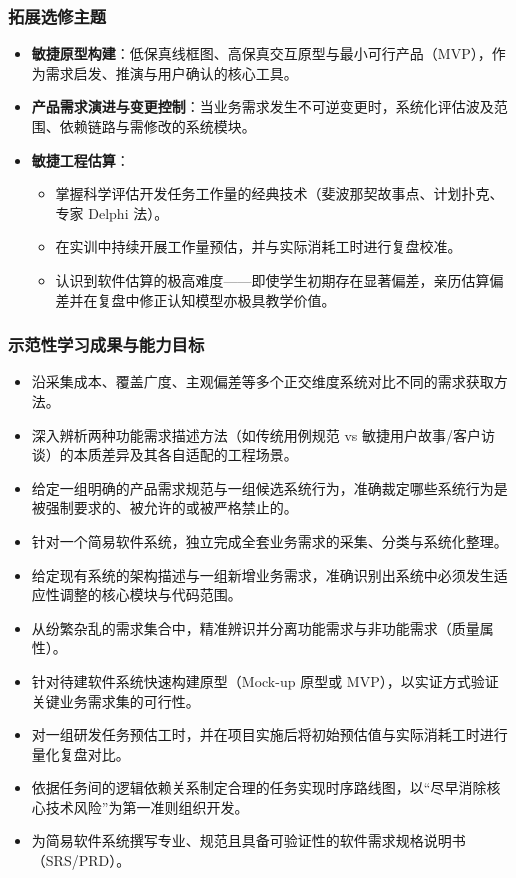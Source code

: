 \subsubsection{拓展选修主题}
\begin{itemize}
    \item \textbf{敏捷原型构建}：低保真线框图、高保真交互原型与最小可行产品（MVP），作为需求启发、推演与用户确认的核心工具。
    \item \textbf{产品需求演进与变更控制}：当业务需求发生不可逆变更时，系统化评估波及范围、依赖链路与需修改的系统模块。
    \item \textbf{敏捷工程估算}：
    \begin{itemize}
        \item 掌握科学评估开发任务工作量的经典技术（斐波那契故事点、计划扑克、专家 Delphi 法）。
        \item 在实训中持续开展工作量预估，并与实际消耗工时进行复盘校准。
        \item 认识到软件估算的极高难度——即使学生初期存在显著偏差，亲历估算偏差并在复盘中修正认知模型亦极具教学价值。
    \end{itemize}
\end{itemize}

\subsubsection{示范性学习成果与能力目标}
\begin{itemize}
    \item 沿采集成本、覆盖广度、主观偏差等多个正交维度系统对比不同的需求获取方法。
    \item 深入辨析两种功能需求描述方法（如传统用例规范 vs 敏捷用户故事/客户访谈）的本质差异及其各自适配的工程场景。
    \item 给定一组明确的产品需求规范与一组候选系统行为，准确裁定哪些系统行为是被强制要求的、被允许的或被严格禁止的。
    \item 针对一个简易软件系统，独立完成全套业务需求的采集、分类与系统化整理。
    \item 给定现有系统的架构描述与一组新增业务需求，准确识别出系统中必须发生适应性调整的核心模块与代码范围。
    \item 从纷繁杂乱的需求集合中，精准辨识并分离功能需求与非功能需求（质量属性）。
    \item 针对待建软件系统快速构建原型（Mock-up 原型或 MVP），以实证方式验证关键业务需求集的可行性。
    \item 对一组研发任务预估工时，并在项目实施后将初始预估值与实际消耗工时进行量化复盘对比。
    \item 依据任务间的逻辑依赖关系制定合理的任务实现时序路线图，以“尽早消除核心技术风险”为第一准则组织开发。
    \item 为简易软件系统撰写专业、规范且具备可验证性的软件需求规格说明书（SRS/PRD）。
\end{itemize}

